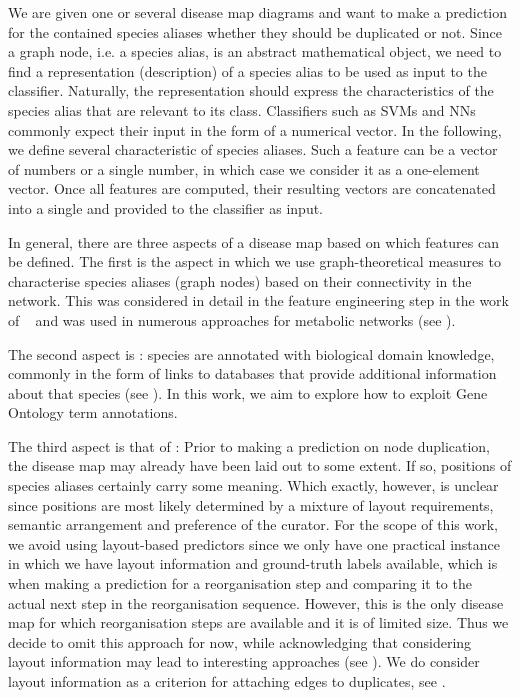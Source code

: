 \documentclass[
	fontsize=10pt, %
	twoside=false, %
	secnumdepth=1, %
  toc=indentunnumbered %
]{kaobook}
\begin{document}
We are given one or several disease map diagrams and want to make a prediction
for the contained species aliases whether they should be duplicated or not.
Since a graph node, i.e. a species alias, is an abstract mathematical object, we
need to find a representation (description) of a species alias to be used as
input to the classifier. Naturally, the representation should express the
characteristics of the species alias that are relevant to its class.
Classifiers such as SVMs and NNs commonly expect their input in the form of a
numerical vector.
%
In the following, we define several characteristic  of
species aliases. Such a feature can be a vector of numbers or a single
number, in which case we consider it as a one-element vector. Once all
features are computed, their resulting vectors are concatenated into a
single  and provided to the classifier as input.

In general, there are three aspects of a disease map based on which features
can be defined. The first is the  aspect in which we use
graph-theoretical measures to characterise species aliases (graph nodes) based
on their connectivity in the network. This was considered in detail in the
feature engineering step in the work of
\citeauthor{nielsen_MachineLearningSupport_2019}~\cite{nielsen_MachineLearningSupport_2019}
and was used in numerous
approaches for metabolic networks (see ).

The second aspect is : species are annotated with biological
domain knowledge, commonly in the form of links to databases that provide
additional information about that species (see ). In
this work, we aim to explore how to exploit Gene Ontology term annotations.

The third aspect is that of : Prior to making a prediction on node
duplication, the disease map may already have been laid out to some extent.
If so, positions of species aliases certainly carry some meaning. Which exactly,
however, is unclear since positions are most likely determined by a mixture of
layout requirements, semantic arrangement and preference of the curator.
%
For the scope of this work, we avoid using layout-based predictors
since we only have one practical instance in which we have layout information
and ground-truth labels available, which is when making a prediction for a
 reorganisation step and comparing it to the actual next
step in the reorganisation sequence. However, this is the only disease map for
which reorganisation steps are available and it is of limited size. Thus we
decide to omit this approach for now, while acknowledging that considering
layout information may lead to interesting approaches (see
). We do consider layout information as a
criterion for attaching edges to duplicates, see . 
\end{document}
